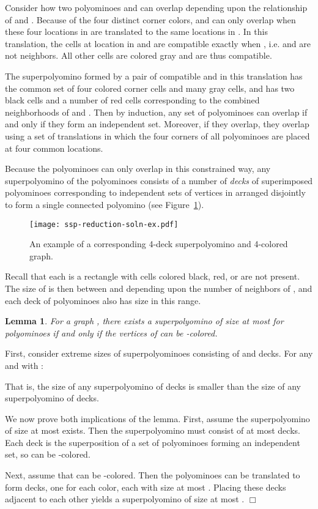\documentclass{article}
\newtheorem{lemma}[theorem]{Lemma}
\newenvironment{proof}[1][Proof]{\begin{trivlist}
\item[\hskip \labelsep {\bfseries #1}]}{\end{trivlist}}
\newcommand{\qed}{\hfill \ensuremath{\Box}}
\begin{document}
Consider how two polyominoes  and  can overlap depending upon the relationship of  and .
Because of the four distinct corner colors,  and  can only overlap when these four locations in  are translated to the same locations in .
In this translation, the cells at location  in  and  are compatible exactly when , i.e.  and  are not neighbors. 
All other cells are colored gray and are thus compatible.

The superpolyomino formed by a pair of compatible  and  in this translation has the common set of four colored corner cells and many gray cells, and has two black cells and a number of red cells corresponding to the combined neighborhoods of  and .
Then by induction, any set of polyominoes can overlap if and only if they form an independent set.
Moreover, if they overlap, they overlap using a set of translations in which the four corners of all polyominoes are placed at four common locations. 

Because the polyominoes can only overlap in this constrained way, any superpolyomino of the polyominoes  consists of a number of \emph{decks} of superimposed polyominoes corresponding to independent sets of vertices in  arranged disjointly to form a single connected polyomino (see Figure~\ref{fig:reduction-soln-ex}). 

\begin{figure}[ht]
\centering
\texttt{[image: ssp-reduction-soln-ex.pdf]}
\caption{An example of a corresponding 4-deck superpolyomino and 4-colored graph.}
\label{fig:reduction-soln-ex}
\end{figure}

Recall that each  is a  rectangle with  cells colored black, red, or are not present.
The size of  is then between  and  depending upon the number of neighbors of , and each deck of polyominoes also has size in this range.

\begin{lemma}
\label{lem:deck-to-coloring}
For a graph , there exists a superpolyomino of size at most  for polyominoes  if and only if the vertices of  can be -colored.
\end{lemma}

\begin{proof}
First, consider extreme sizes of superpolyominoes consisting of  and  decks.
For any  and  with : 

That is, the size of any superpolyomino of  decks is smaller than the size of any superpolyomino of  decks.

We now prove both implications of the lemma.
First, assume the superpolyomino of size at most  exists.
Then the superpolyomino must consist of at most  decks.
Each deck is the superposition of a set of polyominoes forming an independent set, so  can be -colored.

Next, assume that  can be -colored.
Then the polyominoes  can be translated to form  decks, one for each color, each with size at most .
Placing these decks adjacent to each other yields a superpolyomino of size at most .
\qed
\end{proof}
\end{document}
